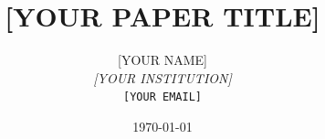 

\title{[YOUR PAPER TITLE]}

\author{[YOUR NAME]\\
  \textit{[YOUR INSTITUTION]}\\
  \texttt{[YOUR EMAIL]}}

\date{\today}



\maketitle

\begin{abstract}
\end{abstract}

\newpage
\tableofcontents
\newpage












\newpage



